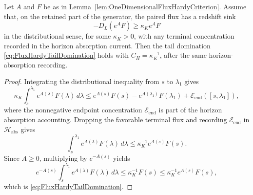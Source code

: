 \begin{lemma}\label{lem:RedshiftSinkHardyTailDomination}
Let $A$ and $F$ be as in Lemma~\ref{lem:OneDimensionalFluxHardyCriterion}.  Assume that, on the retained part of the generator, the paired flux has a redshift sink
\[
    -D_L(e^A F)\ge \kappa_K e^AF
\]
in the distributional sense, for some $\kappa_K>0$, with any terminal concentration recorded in the horizon absorption current.  Then the tail domination \eqref{eq:FluxHardyTailDomination} holds with $C_H=\kappa_K^{-1}$, after the same horizon-absorption recording.
\end{lemma}

\begin{proof}
Integrating the distributional inequality from $s$ to $\lambda_1$ gives
\[
    \kappa_K\int_s^{\lambda_1}e^{A(\lambda)}F(\lambda)\,d\lambda
    \le
    e^{A(s)}F(s)-e^{A(\lambda_1)}F(\lambda_1)+\mathcal E_{\mathrm{end}}([s,\lambda_1]),
\]
where the nonnegative endpoint concentration $\mathcal E_{\mathrm{end}}$ is part of the horizon absorption accounting.  Dropping the favorable terminal flux and recording $\mathcal E_{\mathrm{end}}$ in $\mathcal H_{\mathrm{abs}}$ gives
\[
    \int_s^{\lambda_1}e^{A(\lambda)}F(\lambda)\,d\lambda
    \le
    \kappa_K^{-1}e^{A(s)}F(s).
\]
Since $A\ge0$, multiplying by $e^{-A(s)}$ yields
\[
    e^{-A(s)}
    \int_s^{\lambda_1}e^{A(\lambda)}F(\lambda)\,d\lambda
    \le
    \kappa_K^{-1}F(s)
    \le
    \kappa_K^{-1}e^{A(s)}F(s),
\]
which is \eqref{eq:FluxHardyTailDomination}.
\end{proof}

